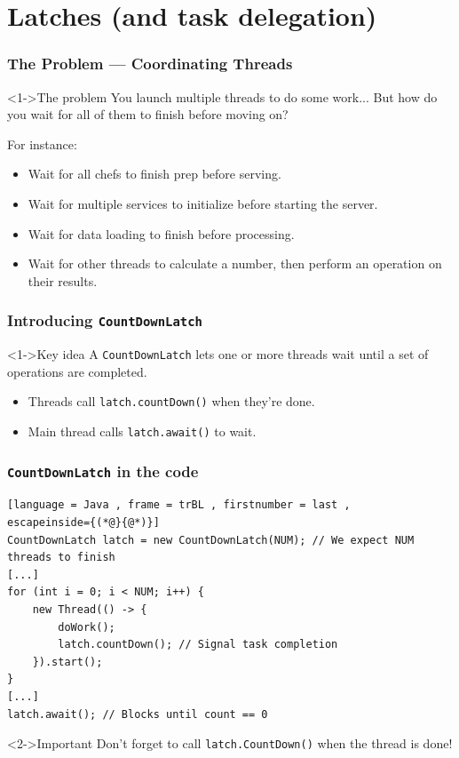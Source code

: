 \documentclass[xcolor={dvipsnames,svgnames},aspectratio=169]{beamer}
\begin{document}
\section{Latches (and task delegation)}

\begin{frame}[fragile]
  \frametitle{The Problem — Coordinating Threads}
  \begin{block}<1->{\faPuzzlePiece \quad The problem}
    You launch multiple threads to do some work... But how do you wait for all
    of them to finish before moving on?
  \end{block}

  For instance:
  \begin{itemize}
  \item[\faBook]<1-> Wait for all chefs to finish prep before serving.
  \item[\faBook]<1-> Wait for multiple services to initialize before starting the server.
  \item[\faBook]<1-> Wait for data loading to finish before processing.
  \item[\faBook]<1-> Wait for other threads to calculate a number, then perform
    an operation on their results.
  \end{itemize}
\end{frame}

\begin{frame}[fragile]
  \frametitle{Introducing \texttt{CountDownLatch}}
  \begin{block}<1->{\faLightbulb \quad Key idea}
    A \texttt{CountDownLatch} lets one or more threads wait until a set of operations are completed.
  \end{block}

  \vspace{0.4cm}
  \begin{itemize}
  \item[\faBook]<1-> Threads call \texttt{latch.countDown()} when they’re done.
  \item[\faBook]<1-> Main thread calls \texttt{latch.await()} to wait.
  \end{itemize}
\end{frame}

\begin{frame}[fragile]
  \frametitle{\texttt{CountDownLatch} in the code}

\begin{lstlisting}[language = Java , frame = trBL , firstnumber = last ,
escapeinside={(*@}{@*)}]
CountDownLatch latch = new CountDownLatch(NUM); // We expect NUM threads to finish
[...]
for (int i = 0; i < NUM; i++) {
    new Thread(() -> {
        doWork();
        latch.countDown(); // Signal task completion
    }).start();
}
[...]
latch.await(); // Blocks until count == 0
\end{lstlisting}

  \begin{block}<2->{\faExclamationTriangle \quad Important}
    Don't forget to call \texttt{latch.CountDown()} when the thread is done!
  \end{block}
\end{frame}
\end{document}
